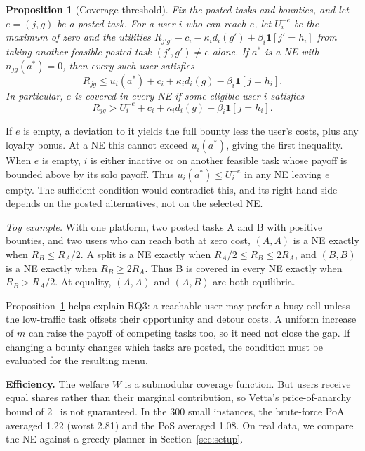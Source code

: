 \documentclass[12pt,draftcls,onecolumn]{IEEEtran}
\newtheorem{proposition}{Proposition}
\begin{document}
\begin{proposition}[Coverage threshold]\label{prop:cov}
Fix the posted tasks and bounties, and let $e=(j,g)$ be a posted task. For a user $i$ who can reach $e$, let $U_i^{-e}$ be the maximum of zero and the utilities $R_{j'g'}-c_i-\kappa_id_i(g')+\beta_i\mathbf 1[j'=h_i]$ from taking another feasible posted task $(j',g')\ne e$ alone. If $a^\ast$ is a NE with $n_{jg}(a^\ast)=0$, then every such user satisfies
\[R_{jg}\le u_i(a^\ast)+c_i+\kappa_id_i(g)-\beta_i\mathbf 1[j=h_i].\]
In particular, $e$ is covered in every NE if some eligible user $i$ satisfies
\[R_{jg}>U_i^{-e}+c_i+\kappa_id_i(g)-\beta_i\mathbf 1[j=h_i].\]
\end{proposition}
\begin{IEEEproof}
If $e$ is empty, a deviation to it yields the full bounty less the user's costs, plus any loyalty bonus. At a NE this cannot exceed $u_i(a^\ast)$, giving the first inequality. When $e$ is empty, $i$ is either inactive or on another feasible task whose payoff is bounded above by its solo payoff. Thus $u_i(a^\ast)\le U_i^{-e}$ in any NE leaving $e$ empty. The sufficient condition would contradict this, and its right-hand side depends on the posted alternatives, not on the selected NE.
\end{IEEEproof}

\emph{Toy example.} With one platform, two posted tasks A and B with positive bounties, and two users who can reach both at zero cost, $(A,A)$ is a NE exactly when $R_B\le R_A/2$. A split is a NE exactly when $R_A/2\le R_B\le2R_A$, and $(B,B)$ is a NE exactly when $R_B\ge2R_A$. Thus B is covered in every NE exactly when $R_B>R_A/2$. At equality, $(A,A)$ and $(A,B)$ are both equilibria.

Proposition~\ref{prop:cov} helps explain RQ3: a reachable user may prefer a busy cell unless the low-traffic task offsets their opportunity and detour costs. A uniform increase of $m$ can raise the payoff of competing tasks too, so it need not close the gap. If changing a bounty changes which tasks are posted, the condition must be evaluated for the resulting menu.

\textbf{Efficiency.} The welfare $W$ is a submodular coverage function. But users receive equal shares rather than their marginal contribution, so Vetta's price-of-anarchy bound of 2~\cite{vetta2002} is not guaranteed. In the 300 small instances, the brute-force PoA averaged 1.22 (worst 2.81) and the PoS averaged 1.08. On real data, we compare the NE against a greedy planner in Section~\ref{sec:setup}.
\end{document}

